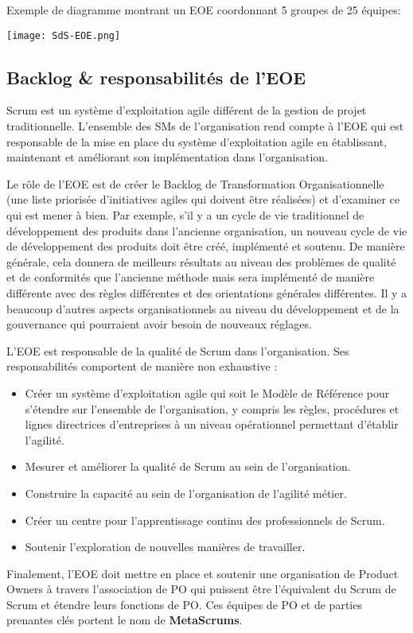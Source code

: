 \documentclass[12pt,a4paper,parskip=full]{scrartcl}
\begin{document}
\pagebreak
Exemple de diagramme montrant un EOE coordonnant 5 groupes de 25 équipes:

\texttt{[image: SdS-EOE.png]}

\subsection{Backlog \& responsabilités de l'EOE}
Scrum est un système d'exploitation agile différent de la gestion de projet traditionnelle.
L'ensemble des SMs de l'organisation rend compte à l'EOE qui est responsable de la mise
en place du système d'exploitation agile en établissant, maintenant et améliorant son
implémentation dans l'organisation.

Le rôle de l'EOE est de créer le Backlog de Transformation Organisationnelle (une liste
priorisée d'initiatives agiles qui doivent être réalisées) et d'examiner ce qui est mener à
bien. Par exemple, s'il y a un cycle de vie traditionnel de développement des produits dans
l'ancienne organisation, un nouveau cycle de vie de développement des produits doit être
créé, implémenté et soutenu. De manière générale, cela donnera de meilleurs résultats au
niveau des problèmes de qualité et de conformités que l'ancienne méthode mais sera
implémenté de manière différente avec des règles différentes et des orientations
générales différentes. Il y a beaucoup d'autres aspects organisationnels au niveau du
développement et de la gouvernance qui pourraient avoir besoin de nouveaux réglages.

L'EOE est responsable de la qualité de Scrum dans l'organisation. Ses responsabilités
comportent de manière non exhaustive :
\begin{itemize}
\item Créer un système d'exploitation agile qui soit le Modèle de Référence pour
s'étendre sur l'ensemble de l'organisation, y compris les règles, procédures et
lignes directrices d'entreprises à un niveau opérationnel permettant d'établir
l'agilité.
\item Mesurer et améliorer la qualité de Scrum au sein de l'organisation.
\item Construire la capacité au sein de l'organisation de l'agilité métier.
\item Créer un centre pour l'apprentissage continu des professionnels de Scrum.
\item Soutenir l'exploration de nouvelles manières de travailler.
\end{itemize}
Finalement, l'EOE doit mettre en place et soutenir une organisation de Product Owners à
travers l'association de PO qui puissent être l'équivalent du Scrum de Scrum et étendre
leurs fonctions de PO. Ces équipes de PO et de parties prenantes clés portent le nom de
\textbf{MetaScrums}.
\end{document}
